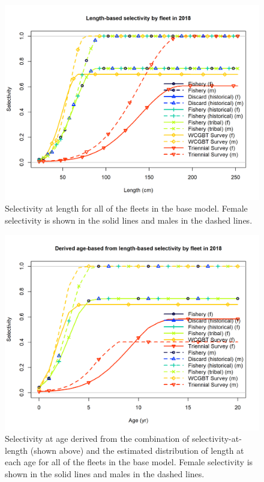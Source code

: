\documentclass[12pt,]{article}
\begin{document}
\begin{figure}
\centering
\includegraphics{r4ss/plots_mod1/sel01_multiple_fleets_length1.png}
\caption{Selectivity at length for all of the fleets in the base model.
Female selectivity is shown in the solid lines and males in the dashed
lines. \label{fig:sel01_multiple_fleets_length1}}
\end{figure}

\begin{figure}
\centering
\includegraphics{r4ss/plots_mod1/sel02_multiple_fleets_age2.png}
\caption{Selectivity at age derived from the combination of
selectivity-at-length (shown above) and the estimated distribution of
length at each age for all of the fleets in the base model. Female
selectivity is shown in the solid lines and males in the dashed lines.
\label{fig:sel02_multiple_fleets_age2}}
\end{figure}
\end{document}
